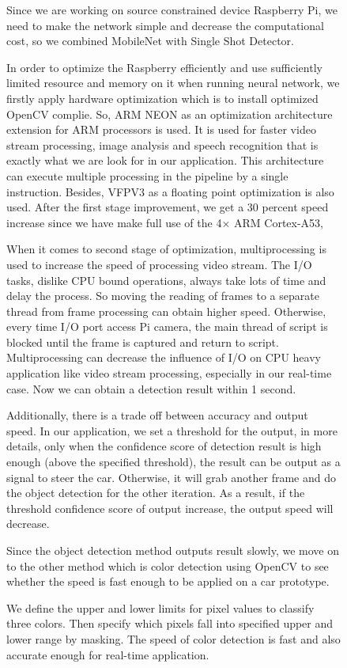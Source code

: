\documentclass[11pt, titlepage]{article} %
\begin{document}
\begin{figure}
Since we are working on source constrained device Raspberry Pi, we need to make the network simple and decrease the computational cost, so we combined MobileNet with Single Shot Detector.

In order to optimize the Raspberry efficiently and use sufficiently limited resource and memory on it when running neural network, we firstly apply hardware optimization which is to install optimized OpenCV complie. So, ARM NEON as an optimization architecture extension for ARM processors is used. It is used for faster video stream processing, image analysis and speech recognition that is exactly what we are look for in our application. This architecture can execute multiple processing in the pipeline by a single instruction. Besides, VFPV3 as a floating point optimization is also used. After the first stage improvement, we get a 30 percent speed increase since we have make full use of the 4× ARM Cortex-A53, 

When it comes to second stage of optimization, multiprocessing is used to increase the speed of processing video stream. The I/O tasks, dislike CPU bound operations, always take lots of time and delay the process. So moving the reading of frames to a separate thread from frame processing can obtain higher speed. Otherwise, every time I/O port access Pi camera, the main thread of script is blocked until the frame is captured and return to script. Multiprocessing can decrease the influence of I/O on CPU heavy application like video stream processing, especially in our real-time case. Now we can obtain a detection result within 1 second.

Additionally, there is a trade off between accuracy and output speed. In our application, we set a threshold for the output, in more details, only when the confidence score of detection result is high enough (above the specified threshold), the result can be output as a signal to steer the car. Otherwise, it will grab another frame and do the object detection for the other iteration. As a result, if the threshold confidence score of output increase, the output speed will decrease.

Since the object detection method outputs result slowly, we move on to the other method which is color detection using OpenCV to see whether the  speed is fast enough to be applied on a car prototype.

We define the upper and lower limits for pixel values to classify three colors. Then specify which pixels fall into specified upper and lower range by masking. The speed of color detection is fast and also accurate enough for real-time application.


\end{figure}
\end{document}
